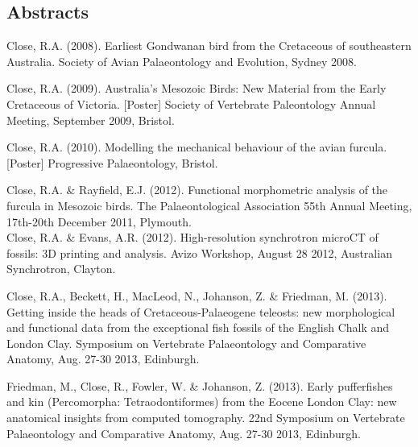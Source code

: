 \documentclass[a4paper, oneside, final]{scrartcl} %
\begin{document}
\begin{center}
\section{Abstracts}
\begin{flushleft}

Close, R.A. (2008). Earliest Gondwanan bird from the Cretaceous of southeastern Australia. Society of Avian Palaeontology and Evolution, Sydney 2008.\\

\vspace{6pt}

Close, R.A. (2009). Australia's Mesozoic Birds: New Material from the Early Cretaceous of Victoria. [Poster] Society of Vertebrate Paleontology Annual Meeting, September 2009, Bristol.\\

\vspace{6pt}

Close, R.A. (2010). Modelling the mechanical behaviour of the avian furcula. [Poster] Progressive Palaeontology, Bristol.\\

\vspace{6pt}

Close, R.A. \& Rayfield, E.J. (2012). Functional morphometric analysis of the furcula in Mesozoic birds. The Palaeontological Association 55th Annual Meeting, 17th-20th December 2011, Plymouth.\\

\vspace{6pt}
Close, R.A. \& Evans, A.R. (2012). High-resolution synchrotron microCT of fossils: 3D printing and analysis. Avizo Workshop, August 28 2012, Australian Synchrotron, Clayton.\\

\vspace{6pt}

Close, R.A., Beckett, H., MacLeod, N., Johanson, Z. \& Friedman, M. (2013). Getting inside the heads of Cretaceous-Palaeogene teleosts: new morphological and functional data from the exceptional fish fossils of the English Chalk and London Clay. Symposium on Vertebrate Palaeontology and Comparative Anatomy, Aug. 27-30 2013, Edinburgh.\\

\vspace{6pt}

\begin{samepage}
Friedman, M., Close, R., Fowler, W. \& Johanson, Z. (2013). Early pufferfishes and kin (Percomorpha: Tetraodontiformes) from the Eocene London Clay: new anatomical insights from computed tomography. 22nd Symposium on Vertebrate Palaeontology and Comparative Anatomy, Aug. 27-30 2013, Edinburgh.\\
\end{samepage}


\end{flushleft}
\end{center}
\end{document}
